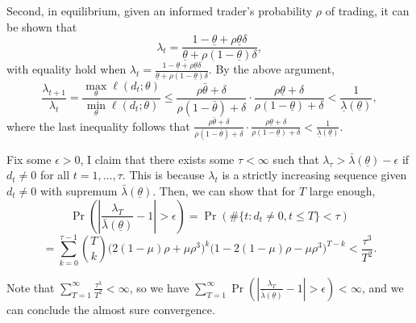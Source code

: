 \documentclass[12pt,a4paper]{article}
\newenvironment{original}{%
  \par\vspace{4pt}\noindent%
  \color{black}%
  \ignorespaces
}{%
  \par\vspace{2pt}%
}
\begin{document}
\begin{original}
Second, in equilibrium, given an informed trader's probability $\rho$ of trading, it can be shown that
\[
\lambda_t = \frac{1-\underline{\theta} + \rho\underline{\theta}\delta}{\underline{\theta} + \rho(1-\underline{\theta})\delta},
\]
with equality hold when $\lambda_t = \frac{1-\underline{\theta} + \rho\underline{\theta}\delta}{\underline{\theta} + \rho(1-\underline{\theta})\delta}$. By the above argument,
\[
\frac{\lambda_{t+1}}{\lambda_t} = \frac{\max_{\theta} \ell(d_t; \theta)}{\min_{\theta} \ell(d_t; \theta)}
\leq \frac{\rho\bar{\theta} + \delta}{\rho(1-\bar{\theta}) + \delta} \cdot \frac{\rho\underline{\theta} + \delta}{\rho(1-\underline{\theta}) + \delta} < \frac{1}{\underline{\lambda}(\underline{\theta})},
\]
where the last inequality follows that $\frac{\rho\bar{\theta} + \delta}{\rho(1-\bar{\theta}) + \delta} \cdot \frac{\rho\underline{\theta} + \delta}{\rho(1-\underline{\theta}) + \delta} < \frac{1}{\underline{\lambda}(\underline{\theta})}$.

Fix some $\epsilon > 0$, I claim that there exists some $\tau < \infty$ such that $\lambda_\tau > \bar{\lambda}(\underline{\theta}) - \epsilon$ if $d_t \neq 0$ for all $t = 1, \dots, \tau$. This is because $\lambda_t$ is a strictly increasing sequence given $d_t \neq 0$ with supremum $\bar{\lambda}(\underline{\theta})$. Then, we can show that for $T$ large enough,
\[
\Pr\left( \left| \frac{\lambda_T}{\bar{\lambda}(\underline{\theta})} - 1 \right| > \epsilon \right) = \Pr\left( \#\{t: d_t \neq 0, t \leq T\} < \tau \right)
\]
\[
= \sum_{k=0}^{\tau-1} \binom{T}{k} \big(2(1-\mu)\rho + \mu\rho^3\big)^k \big(1 - 2(1-\mu)\rho - \mu\rho^3\big)^{T-k}
< \frac{\tau^3}{T^2}.
\]

Note that $\sum_{T=1}^{\infty} \frac{\tau^3}{T^2} < \infty$, so we have $\sum_{T=1}^{\infty} \Pr\left( \left| \frac{\lambda_T}{\bar{\lambda}(\underline{\theta})} - 1 \right| > \epsilon \right) < \infty$, and we can conclude the almost sure convergence.
\end{original}
\end{document}
